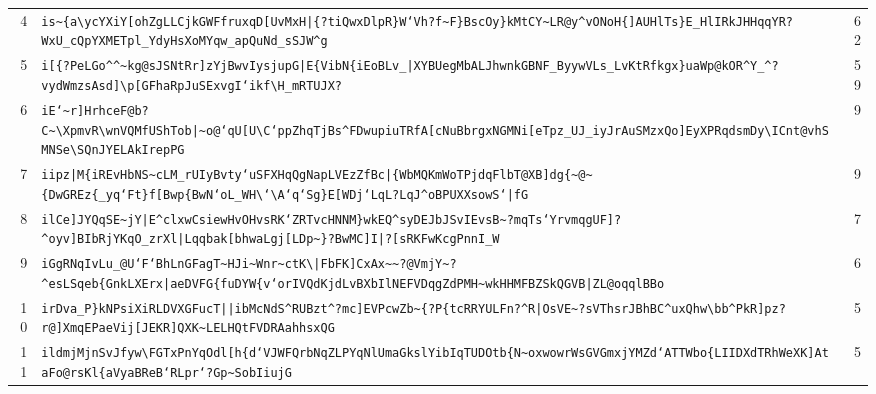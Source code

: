 \begin{xltabular}{\textwidth}{@{} r >{\raggedright\arraybackslash}X r @{}}
        4 & \texttt{is\textasciitilde{}\{a\textbackslash{}ycYXiY[ohZgLLCjkGWFfruxqD[UvMxH|\{?tiQwxDlpR\}W`Vh?f\textasciitilde{}F\}BscOy\}kMtCY\textasciitilde{}LR@y\textasciicircum{}vONoH\{]AUHlTs\}E\_HlIRkJHHqqYR?WxU\_cQpYXMETpl\_YdyHsXoMYqw\_apQuNd\_sSJW\textasciicircum{}g} & 62 \\
        5 & \texttt{i[\{?PeLGo\textasciicircum{}\textasciicircum{}\textasciitilde{}kg@sJSNtRr]zYjBwvIysjupG|E\{VibN\{iEoBLv\_|XYBUegMbALJhwnkGBNF\_ByywVLs\_LvKtRfkgx\}uaWp@kOR\textasciicircum{}Y\_\textasciicircum{}?vydWmzsAsd]\textbackslash{}p[GFhaRpJuSExvgI`ikf\textbackslash{}H\_mRTUJX?} & 59 \\
        6 & \texttt{iE`\textasciitilde{}r]HrhceF@b?C\textasciitilde{}\textbackslash{}XpmvR\textbackslash{}wnVQMfUShTob|\textasciitilde{}o@`qU[U\textbackslash{}C`ppZhqTjBs\textasciicircum{}FDwupiuTRfA[cNuBbrgxNGMNi[eTpz\_UJ\_iyJrAuSMzxQo]EyXPRqdsmDy\textbackslash{}ICnt@vhSMNSe\textbackslash{}SQnJYELAkIrepPG} & 9 \\
        7 & \texttt{iipz|M\{iREvHbNS\textasciitilde{}cLM\_rUIyBvty`uSFXHqQgNapLVEzZfBc|\{WbMQKmWoTPjdqFlbT@XB]dg\{\textasciitilde{}@\textasciitilde{}\{DwGREz\{\_yq`Ft\}f[Bwp\{BwN`oL\_WH\textbackslash{}`\textbackslash{}A`q`Sg\}E[WDj`LqL?LqJ\textasciicircum{}oBPUXXsowS`|fG} & 9 \\
        8 & \texttt{ilCe]JYQqSE\textasciitilde{}jY|E\textasciicircum{}clxwCsiewHvOHvsRK`ZRTvcHNNM\}wkEQ\textasciicircum{}syDEJbJSvIEvsB\textasciitilde{}?mqTs`YrvmqgUF]?\textasciicircum{}oyv]BIbRjYKqO\_zrXl|Lqqbak[bhwaLgj[LDp\textasciitilde{}\}?BwMC]I|?[sRKFwKcgPnnI\_W} & 7 \\
        9 & \texttt{iGgRNqIvLu\_@U`F`BhLnGFagT\textasciitilde{}HJi\textasciitilde{}Wnr\textasciitilde{}ctK\textbackslash{}|FbFK]CxAx\textasciitilde{}\textasciitilde{}?@VmjY\textasciitilde{}?\textasciicircum{}esLSqeb\{GnkLXErx|aeDVFG\{fuDYW\{v`orIVQdKjdLvBXbIlNEFVDqgZdPMH\textasciitilde{}wkHHMFBZSkQGVB|ZL@oqqlBBo} & 6 \\
        10 & \texttt{irDva\_P\}kNPsiXiRLDVXGFucT||ibMcNdS\textasciicircum{}RUBzt\textasciicircum{}?mc]EVPcwZb\textasciitilde{}\{?P\{tcRRYULFn?\textasciicircum{}R|OsVE\textasciitilde{}?sVThsrJBhBC\textasciicircum{}uxQhw\textbackslash{}bb\textasciicircum{}PkR]pz?r@]XmqEPaeVij[JEKR]QXK\textasciitilde{}LELHQtFVDRAahhsxQG} & 5 \\
        11 & \texttt{ildmjMjnSvJfyw\textbackslash{}FGTxPnYqOdl[h\{d`VJWFQrbNqZLPYqNlUmaGkslYibIqTUDOtb\{N\textasciitilde{}oxwowrWsGVGmxjYMZd`ATTWbo\{LIIDXdTRhWeXK]AtaFo@rsKl\{aVyaBReB`RLpr`?Gp\textasciitilde{}SobIiujG} & 5 \\

\end{xltabular}
